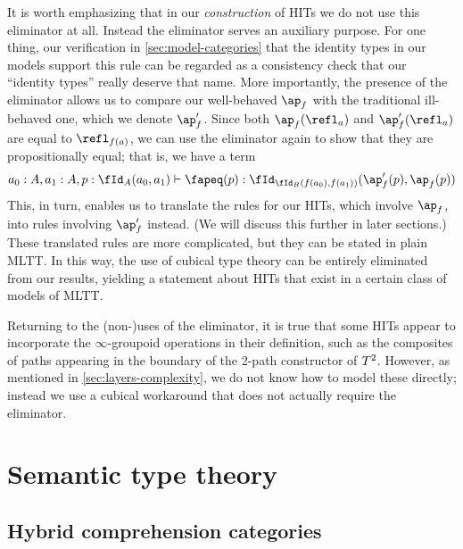 \documentclass{amsart}
\begin{document}
It is worth emphasizing that in our \emph{construction} of HITs we do not use this eliminator at all.
Instead the eliminator serves an auxiliary purpose.
For one thing, our verification in \cref{sec:model-categories} that the identity types in our models support this rule can be regarded as a consistency check that our ``identity types'' really deserve that name.
More importantly, the presence of the eliminator allows us to compare our well-behaved $\ap_f$ with the traditional ill-behaved one, which we denote $\ap'_f$.
Since both $\ap_f(\refl_a)$ and $\ap'_f(\refl_a)$ are equal to $\refl_{f(a)}$, we can use the eliminator again to show that they are propositionally equal; that is, we have a term
\[ \jd{a_0:A , a_1:A, p:\id[A]{a_0}{a_1}}{\fapeq(p) : \id[{\id[B]{f(a_0)}{f(a_1)}}]{\ap'_f(p)}{\ap_f(p)}} \]
This, in turn, enables us to translate the rules for our HITs, which involve $\ap_f$, into rules involving $\ap'_f$ instead.
(We will discuss this further in later sections.)
These translated rules are more complicated, but they can be stated in plain MLTT.
In this way, the use of cubical type theory can be entirely eliminated from our results, yielding a statement about HITs that exist in a certain class of models of MLTT.

Returning to the (non-)uses of the eliminator, it is true that some HITs appear to incorporate the $\infty$-groupoid operations in their definition, such as the composites of paths appearing in the boundary of the 2-path constructor of $T^2$.
However, as mentioned in \cref{sec:layers-complexity}, we do not know how to model these directly; instead we use a cubical workaround that does not actually require the eliminator.


\section{Semantic type theory}
\label{sec:semantic-type-theory}

\subsection{Hybrid comprehension categories}
\label{sec:hybrid-ccs}
\end{document}
